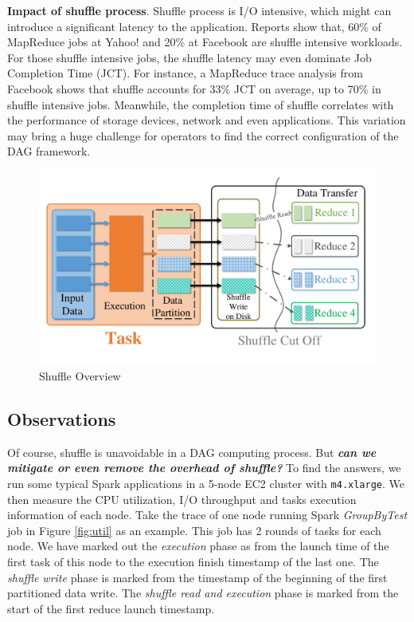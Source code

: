 
\textbf{Impact of shuffle process}. Shuffle process is I/O intensive, which might can introduce a significant latency to the application. Reports show that, 60\% of MapReduce jobs at Yahoo!
and 20\% at Facebook are shuffle intensive workloads\cite{shufflewatcher}. For those shuffle intensive jobs, the shuffle latency may even dominate Job Completion Time (JCT).
For instance, a MapReduce trace analysis from Facebook shows that shuffle accounts for 33\% JCT on average, up to 70\% in shuffle intensive jobs\cite{managing}.
Meanwhile, the completion time of shuffle correlates with the performance of storage devices, network and even applications.
This variation may bring a huge challenge for operators to find the correct configuration of the DAG framework.
\begin{figure}
	\centering
	\includegraphics[width=\linewidth]{fig/shuffle_process}
	\caption{Shuffle Overview}
	\label{fig:shuffle_process}
\end{figure}

\subsection{Observations} \label{observation}
Of course, shuffle is unavoidable in a DAG computing process. But \textbf{\textit{can we mitigate or even remove the overhead of shuffle?}} To find the answers, we run some typical Spark applications in a 5-node EC2 cluster with \texttt{m4.xlarge}. We then measure the CPU utilization, I/O throughput and tasks execution information of each node. Take the trace of one node running Spark \textit{GroupByTest} job in Figure \ref{fig:util} as an example. This job has 2 rounds of tasks for each node.
We have marked out the \textit{execution} phase as from the launch time of the first task of this node to the execution finish timestamp of the last one. The \textit{shuffle write} phase is marked from the timestamp of the beginning of the first partitioned data write. The \textit{shuffle read and execution} phase is marked from the start of the first reduce launch timestamp.

